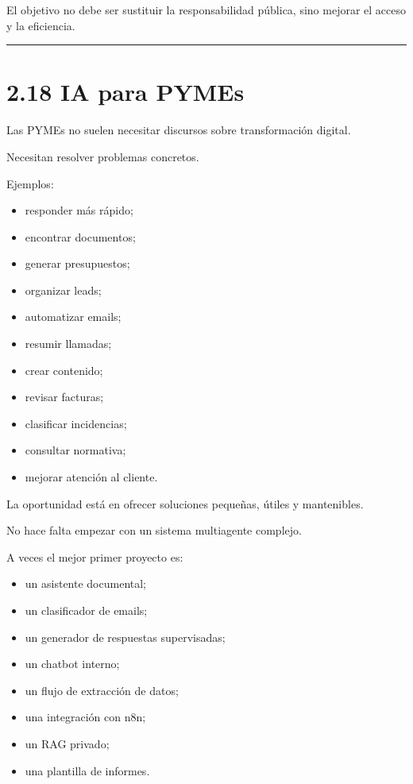 El objetivo no debe ser sustituir la responsabilidad pública, sino
mejorar el acceso y la eficiencia.

\begin{center}\rule{0.5\linewidth}{0.5pt}\end{center}

\section{2.18 IA para PYMEs}\label{ia-para-pymes}

Las PYMEs no suelen necesitar discursos sobre transformación digital.

Necesitan resolver problemas concretos.

Ejemplos:

\begin{itemize}
\tightlist
\item
  responder más rápido;
\item
  encontrar documentos;
\item
  generar presupuestos;
\item
  organizar leads;
\item
  automatizar emails;
\item
  resumir llamadas;
\item
  crear contenido;
\item
  revisar facturas;
\item
  clasificar incidencias;
\item
  consultar normativa;
\item
  mejorar atención al cliente.
\end{itemize}

La oportunidad está en ofrecer soluciones pequeñas, útiles y
mantenibles.

No hace falta empezar con un sistema multiagente complejo.

A veces el mejor primer proyecto es:

\begin{itemize}
\tightlist
\item
  un asistente documental;
\item
  un clasificador de emails;
\item
  un generador de respuestas supervisadas;
\item
  un chatbot interno;
\item
  un flujo de extracción de datos;
\item
  una integración con n8n;
\item
  un RAG privado;
\item
  una plantilla de informes.
\end{itemize}

